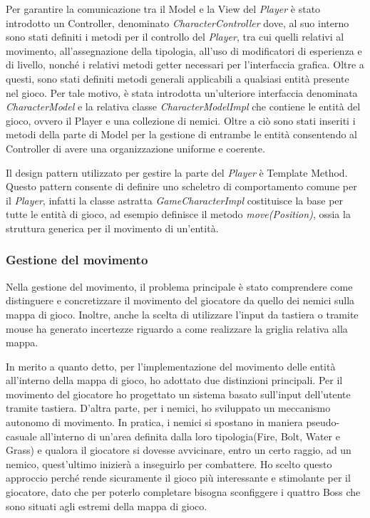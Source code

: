 \documentclass[a4paper,12pt]{report}
\begin{document}
Per garantire la comunicazione tra il Model e la View del \textit{Player} è stato introdotto un Controller, denominato \textit{CharacterController} dove, al suo interno sono stati definiti i metodi per il controllo del \textit{Player}, tra cui quelli relativi al movimento, all'assegnazione della tipologia, all'uso di modificatori di esperienza e di livello, nonché i relativi metodi getter necessari per l'interfaccia grafica.
Oltre a questi, sono stati definiti metodi generali applicabili a qualsiasi entità presente nel gioco. 
Per tale motivo, è stata introdotta un'ulteriore interfaccia denominata \textit{CharacterModel} e la relativa classe \textit{CharacterModelImpl} che contiene le entità del gioco, ovvero il Player e una collezione di nemici. Oltre a ciò sono stati inseriti i metodi della parte di Model per la gestione di entrambe le entità consentendo al Controller di avere una organizzazione uniforme e coerente.

Il design pattern utilizzato per gestire la parte del \textit{Player} è Template Method. Questo pattern consente di definire uno scheletro di comportamento comune per il \textit{Player}, infatti la classe astratta \textit{GameCharacterImpl} costituisce la base per tutte le entità di gioco, ad esempio definisce il metodo \textit{move(Position)}, ossia la struttura generica per il movimento di un'entità.

\subsubsection{Gestione del movimento}
Nella gestione del movimento, il problema principale è stato comprendere come distinguere e concretizzare il movimento del giocatore da quello dei nemici sulla mappa di gioco. Inoltre, anche la scelta di utilizzare l'input da tastiera o tramite mouse ha generato incertezze riguardo a come realizzare la griglia relativa alla mappa.

In merito a quanto detto, per l'implementazione del movimento delle entità all'interno della mappa di gioco, ho adottato due distinzioni principali. Per il movimento del giocatore ho progettato un sistema basato sull'input dell'utente tramite tastiera. D'altra parte, per i nemici, ho sviluppato un meccanismo autonomo di movimento. In pratica, i nemici si spostano in maniera pseudo-casuale all'interno di un'area definita dalla loro tipologia(Fire, Bolt, Water e Grass) e qualora il giocatore si dovesse avvicinare, entro un certo raggio, ad un nemico, quest'ultimo inizierà a inseguirlo per combattere. Ho scelto questo approccio perché rende sicuramente il gioco più interessante e stimolante per il giocatore, dato che per poterlo completare bisogna sconfiggere i quattro Boss che sono situati agli estremi della mappa di gioco.
\end{document}
